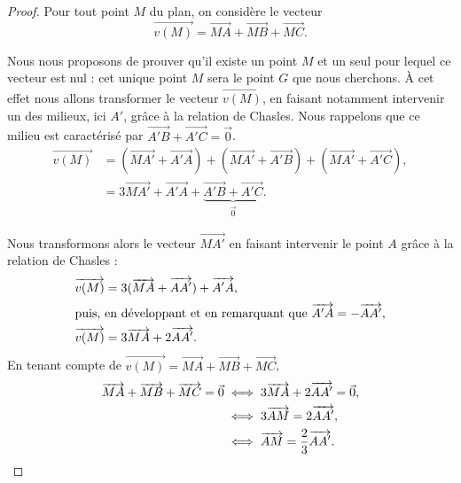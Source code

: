 \begin{proof}
Pour tout point $M$ du plan, on considère le vecteur 
\[
\overrightarrow{v(M)}=\overrightarrow{MA}+\overrightarrow{MB}+\overrightarrow{MC}.
\]

 Nous nous proposons de prouver qu'il existe un point $M$ et un seul pour lequel ce vecteur est nul : cet unique point $M$ sera le point $G$ que nous cherchons. À cet effet nous allons transformer le vecteur $\overrightarrow{v(M)}$, en faisant notamment intervenir un des milieux, ici $A'$, grâce à la relation de Chasles. Nous rappelons que ce milieu est caractérisé par $\overrightarrow{A'B}+\overrightarrow{A'C}=\vec{0}$.
\begin{align*}
\overrightarrow{v(M)}&=
(\overrightarrow{MA'}+\overrightarrow{A'A})+
(\overrightarrow{MA'}+\overrightarrow{A'B})+
(\overrightarrow{MA'}+\overrightarrow{A'C}),\\
&=
3\overrightarrow{MA'}+\overrightarrow{A'A}+\underbrace{\overrightarrow{A'B}+\overrightarrow{A'C}}_{\vec{0}}.
\end{align*}

Nous transformons alors le vecteur $\overrightarrow{MA'}$ en faisant intervenir le point $A$ grâce à la relation de Chasles :
\begin{align*}
\overrightarrow{v(M)}&=3(\overrightarrow{MA}+\overrightarrow{AA'})+\overrightarrow{A'A},\\
\intertext{puis, en développant et en remarquant que $\overrightarrow{A'A}=-\overrightarrow{AA'}$,}
\overrightarrow{v(M)}&=3\overrightarrow{MA}+2\overrightarrow{AA'}.
\end{align*}%
En tenant compte de $\overrightarrow{v(M)}=\overrightarrow{MA}+\overrightarrow{MB}+\overrightarrow{MC}$,
  \begin{align}\overrightarrow{MA}+\overrightarrow{MB}+\overrightarrow{MC}=\vec{0}
 &\iff 3\overrightarrow{MA}+2\overrightarrow{AA'}=\vec{0},\notag\\
 &\iff 3\overrightarrow{AM}=2\overrightarrow{AA'},\notag\\
  &\iff\overrightarrow{AM}=\dfrac23\overrightarrow{AA'}.\label{caraccg}\end{align}


\end{proof}

